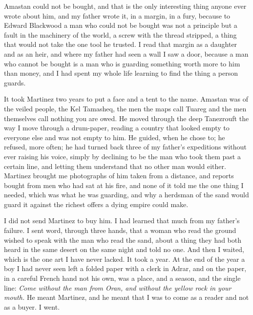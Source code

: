 
Amastan could not be bought, and that is the only interesting thing anyone ever wrote about him, and my father wrote it, in a margin, in a fury, because to Edward Blackwood a man who could not be bought was not a principle but a fault in the machinery of the world, a screw with the thread stripped, a thing that would not take the one tool he trusted. I read that margin as a daughter and as an heir, and where my father had seen a wall I saw a door, because a man who cannot be bought is a man who is guarding something worth more to him than money, and I had spent my whole life learning to find the thing a person guards.\par

It took Martinez two years to put a face and a tent to the name. Amastan was of the veiled people, the Kel Tamasheq, the men the maps call Tuareg and the men themselves call nothing you are owed. He moved through the deep Tanezrouft the way I move through a drum-paper, reading a country that looked empty to everyone else and was not empty to him. He guided, when he chose to; he refused, more often; he had turned back three of my father's expeditions without ever raising his voice, simply by declining to be the man who took them past a certain line, and letting them understand that no other man would either. Martinez brought me photographs of him taken from a distance, and reports bought from men who had sat at his fire, and none of it told me the one thing I needed, which was what he was guarding, and why a herdsman of the sand would guard it against the richest offers a dying empire could make.\par

I did not send Martinez to buy him. I had learned that much from my father's failure. I sent word, through three hands, that a woman who read the ground wished to speak with the man who read the sand, about a thing they had both heard in the same desert on the same night and told no one. And then I waited, which is the one art I have never lacked. It took a year. At the end of the year a boy I had never seen left a folded paper with a clerk in Adrar, and on the paper, in a careful French hand not his own, was a place, and a season, and the single line: \emph{Come without the man from Oran, and without the yellow rock in your mouth.} He meant Martinez, and he meant that I was to come as a reader and not as a buyer. I went.\par

